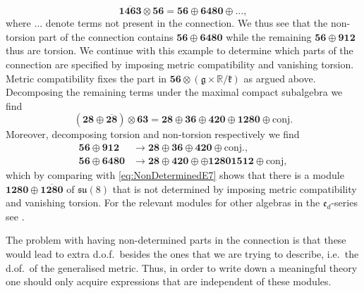 \begin{equation}
    \overbar{\mathbf{1463}}\otimes\mathbf{56} = \mathbf{56}\oplus\mathbf{6480}\oplus\ldots,
\end{equation}
where $\ldots$ denote terms not present in the connection. We thus see that the non-torsion part of the connection contains $\mathbf{56}\oplus \mathbf{6480}$ while the remaining $\mathbf{56}\oplus\mathbf{912}$ thus are torsion. We continue with this example to determine which parts of the connection are specified by imposing metric compatibility and vanishing torsion. Metric compatibility fixes the part in $\mathbf{56}\otimes(\mathfrak{g}\times\mathbb{R}/\mathfrak{k})$ as argued above. Decomposing the remaining terms under the maximal compact subalgebra we find 
\begin{equation}\label{eq:NonDeterminedE7}
    \left(\mathbf{28}\oplus\overbar{\mathbf{28}}\right)\otimes\mathbf{63} = \mathbf{28}\oplus\mathbf{36}\oplus\mathbf{420}\oplus\mathbf{1280}\oplus \text{conj.}
\end{equation}
Moreover, decomposing torsion and non-torsion respectively we find  
\begin{equation}
    \begin{aligned}
        \mathbf{56}\oplus\mathbf{912}&\to \mathbf{28}\oplus\mathbf{36}\oplus\mathbf{420}\oplus\text{conj.},\\
        \mathbf{56}\oplus\mathbf{6480}&\to\mathbf{28}\oplus\mathbf{420}\oplus\oplus\mathbf{1280}\mathbf{1512}\oplus\text{conj},
    \end{aligned}
\end{equation}
which by comparing with \eqref{eq:NonDeterminedE7} shows that there is a module $\mathbf{1280}\oplus\overbar{\mathbf{1280}}$ of $\mathfrak{su}(8)$ that is not determined by imposing metric compatibility and vanishing torsion. For the relevant modules for other algebras in the $\mathfrak{e}_{d}$-series see \cite{Cederwall:2013naa}. 

The problem with having non-determined parts in the connection is that these would lead to extra d.o.f.\ besides the ones that we are trying to describe, i.e.\ the d.of.\ of the generalised metric. Thus, in order to write down a meaningful theory one should only acquire expressions that are independent of these modules.





